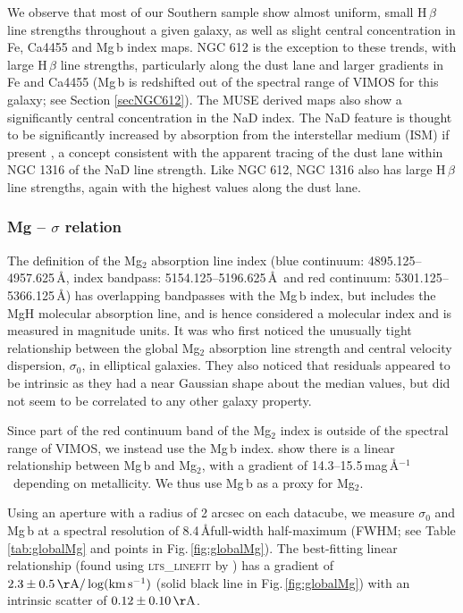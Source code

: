 			We observe that most of our Southern sample show almost uniform, small H\,$\beta$ line strengths throughout a given galaxy, as well as slight central concentration in Fe, Ca4455 and Mg\,b index maps. NGC 612 is the exception to these trends, with large H\,$\beta$ line strengths, particularly along the dust lane and larger gradients in Fe and Ca4455 (Mg\,b is redshifted out of the spectral range of VIMOS for this galaxy; see Section \ref{secNGC612}). The MUSE derived maps also show a significantly central concentration in the NaD index. The NaD feature is thought to be significantly increased by absorption from the interstellar medium (ISM) if present \citet[e.g.][]{Phillips1993, Bergmann2009}, a concept consistent with the apparent tracing of the dust lane within NGC 1316 of the NaD line strength. Like NGC 612, NGC 1316 also has large H\,$\beta$ line strengths, again with the highest values along the dust lane. 

		\subsubsection{Mg -- $\sigma$ relation}
			\label{subsubssec:Mgsigma}
			The definition of the Mg$_2$ absorption line index (blue continuum: 4895.125--4957.625\,\AA, index bandpass: 5154.125--5196.625\,\AA\ and red continuum: 5301.125--5366.125\,\AA) has overlapping bandpasses with the Mg\,b index, but includes the MgH molecular absorption line, and is hence considered a molecular index and is measured in magnitude units. It was \citet{Bender1993} who first noticed the unusually tight relationship between the global Mg$_2$ absorption line strength and central velocity dispersion, $\sigma_0$, in elliptical galaxies. They also noticed that residuals appeared to be intrinsic as they had a near Gaussian shape about the median values, but did not seem to be correlated to any other galaxy property. 

			Since part of the red continuum band of the Mg$_2$ index is outside of the spectral range of VIMOS, we instead use the Mg\,b index. \citet{Ziegler1997} show there is a linear relationship between Mg\,b and Mg$_2$, with a gradient of 14.3--15.5\,mag\,\AA$^{-1}$\ depending on metallicity. We thus use Mg\,b as a proxy for Mg$_2$. 

			Using an aperture with a radius of 2 arcsec on each datacube, we measure $\sigma_0$ and Mg\,b at a spectral resolution of 8.4\,\AA full-width half-maximum (FWHM; see Table \ref{tab:globalMg} and points in Fig.\,\ref{fig:globalMg}). The best-fitting linear relationship (found using \textsc{lts\_linefit} by \citet{Cappellari2013}) has a gradient of $2.3 \pm 0.5 \,\mathrm{\AA/\log(km \, s^{-1})}$ (solid black line in Fig.\,\ref{fig:globalMg}) with an intrinsic scatter of $0.12 \pm 0.10 \, \mathrm{\AA}$. 

